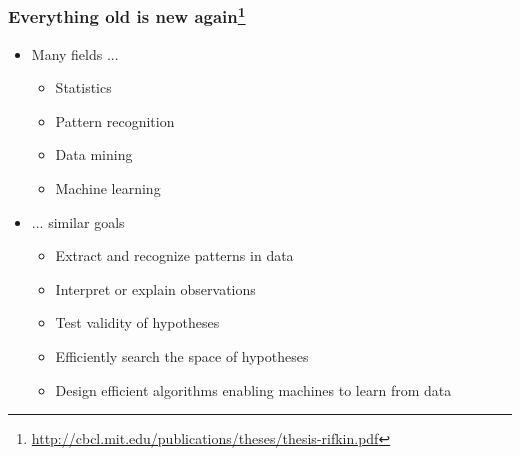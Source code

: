 \documentclass[xcolor=dvipsnames, 9pt]{beamer}
\begin{document}
\begin{frame}
  \frametitle{Everything old is new again\footnote{\url{http://cbcl.mit.edu/publications/theses/thesis-rifkin.pdf}}}

  \begin{itemize}
    \item Many fields ...
      \begin{itemize}
        \item Statistics
        \item Pattern recognition
        \item Data mining
        \item Machine learning
      \end{itemize}
    \item ... similar goals
      \begin{itemize}
        \item Extract and recognize patterns in data
        \item Interpret or explain observations
        \item Test validity of hypotheses
        \item Efficiently search the space of hypotheses
        \item Design efficient algorithms enabling machines to learn from data
      \end{itemize}
  \end{itemize}

\end{frame}
\end{document}
